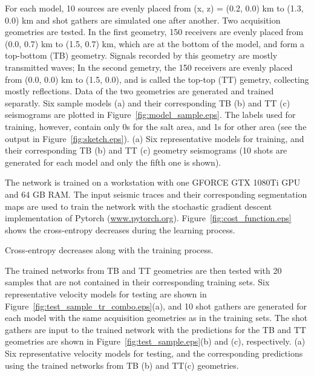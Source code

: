 \documentclass[manuscript,ulem,graphix,revised]{geophysics}
\begin{document}
For each model, 10 sources are evenly placed from (x, z) = (0.2, 0.0) km to (1.3, 0.0) km and shot gathers are simulated one after another. 
Two acquisition geometries are tested. In the first geometry, 150 receivers are evenly placed from (0.0, 0.7) km to (1.5, 0.7) km, which are at the bottom of the model, and form a top-bottom (TB) geometry. Signals recorded by this geometry are mostly transmitted waves;
In the second gemetry, the 150 receivers are evenly placed from (0.0, 0.0) km to (1.5, 0.0), and is called the top-top (TT) gemetry, collecting mostly reflections. Data of the two geometries are generated and trained separatly.  
Six sample models (a) and their corresponding TB (b) and TT (c) seismograms are plotted in Figure~\ref{fig:model_sample.eps}. The labels used for training, however, contain only 0s for the salt area, and 1s for other area (see the output in Figure~\ref{fig:sketch.eps}). 
{(a) Six representative models for training, and their corresponding TB (b) and TT (c) geometry seismograms (10 shots are generated for each model and only the fifth one is shown).}

The network is trained on a workstation with one GFORCE GTX 1080Ti GPU and 64 GB RAM. The input seismic traces and their corresponding segmentation maps are used to train the network with the stochastic gradient descent implementation of Pytorch (\url{www.pytorch.org}). Figure~\ref{fig:cost_function.eps} shows the cross-entropy decreases during the learning process.

{Cross-entropy decreases along with the training process.}

The trained networks from TB and TT geometries are then tested with 20 samples that are not contained in their corresponding training sets. Six representative velocity models for testing are shown in Figure~\ref{fig:test_sample_tr_combo.eps}(a), and 10 shot gathers are generated for each model with the same acquisition geometries as in the training sets. The shot gathers are input to the trained network with the predictions for the TB and TT geometries are shown in Figure~\ref{fig:test_sample.eps}(b) and (c), respectively.
{(a) Six representative velocity models for testing, and the corresponding predictions using the trained networks from TB (b) and TT(c) geometries.}
\end{document}
